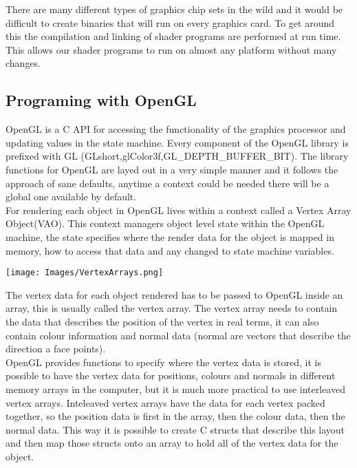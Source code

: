 

There are many different types of graphics chip sets in the wild and it would be
difficult to create binaries that will run on every graphics card. To get around
this the compilation and linking of shader programs are performed at run time.
This allows our shader programs to run on almost any platform without many
changes.\\ 

\subsection{Programing with OpenGL}
OpenGL is a C API for accessing the functionality of the graphics processor and
updating values in the state machine. Every component of the OpenGL library is
prefixed with GL (GLshort,glColor3f,GL\_DEPTH\_BUFFER\_BIT). 
The library functions for OpenGL are layed out in a very simple manner and it
follows the approach of sane defaults, anytime a context could be needed there 
will be a global one available by default.\\

For rendering each object in OpenGL lives within a context called a Vertex Array
Object(VAO). This context managers object level state within the OpenGL machine, the
state specifies where the render data for the object is mapped in memory, how to 
access that data and any changed to state machine variables.\\

\begin{center}
\texttt{[image: Images/VertexArrays.png]}
\end{center}

The vertex data for each object rendered has to be passed to OpenGL inside an array,
this is usually called the vertex array. The vertex array needs to contain the data
that describes the position of the vertex in real terms, it can also contain colour
information and normal data (normal are vectors that describe the direction a face
points).\\

OpenGL provides functions to specify where the vertex data is stored, it is possible
to have the vertex data for positions, colours and normals in different memory arrays
in the computer, but it is much more practical to use interleaved vertex arrays.
Inteleaved vertex arrays have the data for each vertex packed together, so the 
position data is first in the array, then  the colour data, then the normal data. 
This way it is possible to create C structs that describe this layout and then map
those structs onto an array to hold all of the vertex data for the object.\\

